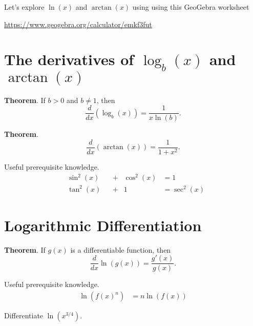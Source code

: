 \documentclass[../main.tex]{subfiles}
\begin{document}
Let's explore \(\ln(x)\) and \(\arctan(x)\) using using this GeoGebra worksheet 

\url{https://www.geogebra.org/calculator/emkf3fut}

\clearpage

\section{The derivatives of \(\log_{b}(x)\) and \(\arctan(x)\)}

\begin{mdframed}[style=withref]
  \textbf{Theorem}. If \(b > 0\) and \(b \ne 1\), then
  \[
    \frac{d}{dx} \left( \log_{b}(x) \right) = \frac{1}{x \ln(b)}.
  \]

\end{mdframed}

\vspace{3in}
\begin{mdframed}[style=withref]
  \textbf{Theorem}. 
  \[
    \frac{d}{dx} (\arctan(x)) = \frac{1}{1 + x^{2}}.
  \]

\end{mdframed}
\begin{mdframed}[style=sidenote, userdefinedwidth=.4\textwidth]
Useful prerequisite knowledge. 
\begin{align} 
    &\sin^{2}(x)& &+ &\cos^{2}(x) & = 1 \\[1ex]
    &\tan^{2}(x)& &+ &1& = \sec^{2}(x)
\end{align}
\end{mdframed}
\clearpage
\section{Logarithmic Differentiation}
\begin{mdframed}[style=withref]
  \textbf{Theorem}. If \(g(x)\) is a differentiable function, then 
  \[
    \frac{d}{dx} \ln( g(x) ) = \frac{g'(x)}{g(x)}.
  \]

\end{mdframed}
\begin{mdframed}[style=sidenote, userdefinedwidth=.4\textwidth]
Useful prerequisite knowledge. 
\begin{align} 
  \ln(f(x)^{n}) &= n\ln(f(x))
\end{align}
\end{mdframed}

\begin{example}
  Differentiate \(\ln(x^{3/4})\).
\end{example}
\vfill
\end{document}
